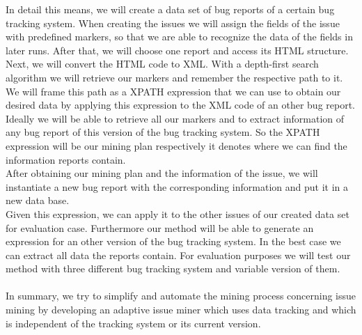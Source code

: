 In detail this means, we will create a data set of bug reports of a certain bug tracking system. When creating the issues we will assign the fields of the issue with predefined markers, so that we are able to recognize the data of the fields in later runs. After that, we will choose one report and access its HTML structure. Next, we will convert the HTML code to XML. With a depth-first search algorithm we will retrieve our markers and remember the respective path to it. We will frame this path as a XPATH expression that we can use to obtain our desired data by applying this expression to the XML code of an other bug report. Ideally we will be able to retrieve all our markers and to extract information of any bug report of this version of the bug tracking system. So the XPATH expression will be our mining plan respectively it denotes where we can find the information reports contain. \\ After obtaining our mining plan and the information of the issue, we will instantiate a new bug report with the corresponding information and put it in a new data base. \\ Given this expression, we can apply it to the other issues of our created data set for evaluation case. Furthermore our method will be able to generate an expression for an other version of the bug tracking system. In the best case we can extract all data the reports contain. For evaluation purposes we will test our method with three different bug tracking system and variable version of them. \\ \\ In summary, we try to simplify and automate the mining process concerning issue mining by developing an adaptive issue miner which uses data tracking and which is independent of the tracking system or its current version.



